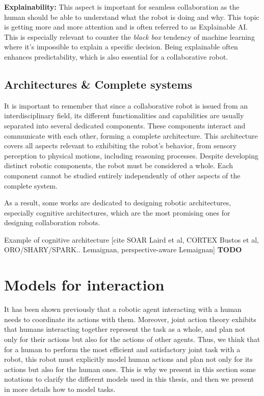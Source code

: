 \textbf{Explainability:} This aspect is important for seamless collaboration as the human should be able to understand what the robot is doing and why. This topic is getting more and more attention and is often referred to as Explainable AI. This is especially relevant to counter the \textit{black box} tendency of machine learning where it's impossible to explain a specific decision. Being explainable often enhances predictability, which is also essential for a collaborative robot.

\subsection{Architectures \& Complete systems}

It is important to remember that since a collaborative robot is issued from an interdisciplinary field, its different functionalities and capabilities are usually separated into several dedicated components. These components interact and communicate with each other, forming a complete architecture. This architecture covers all aspects relevant to exhibiting the robot's behavior, from sensory perception to physical motions, including reasoning processes. 
Despite developing distinct robotic components, the robot must be considered a whole. Each component cannot be studied entirely independently of other aspects of the complete system.  

As a result, some works are dedicated to designing robotic architectures, especially cognitive architectures, which are the most promising ones for designing collaboration robots. 

Example of cognitive architecture
[cite SOAR Laird et al, CORTEX Bustos et al, ORO/SHARY/SPARK.. Lemaignan, perspective-aware Lemaignan]
\textbf{TODO}

\section{Models for interaction}


It has been shown previously that a robotic agent interacting with a human needs to coordinate its actions with them. Moreover, joint action theory exhibits that humans interacting together represent the task as a whole, and plan not only for their actions but also for the actions of other agents. Thus, we think that for a human to perform the most efficient and satisfactory joint task with a robot, this robot must explicitly model human actions and plan not only for its actions but also for the human ones. This is why we present in this section some notations to clarify the different models used in this thesis, and then we present in more details how to model tasks.

